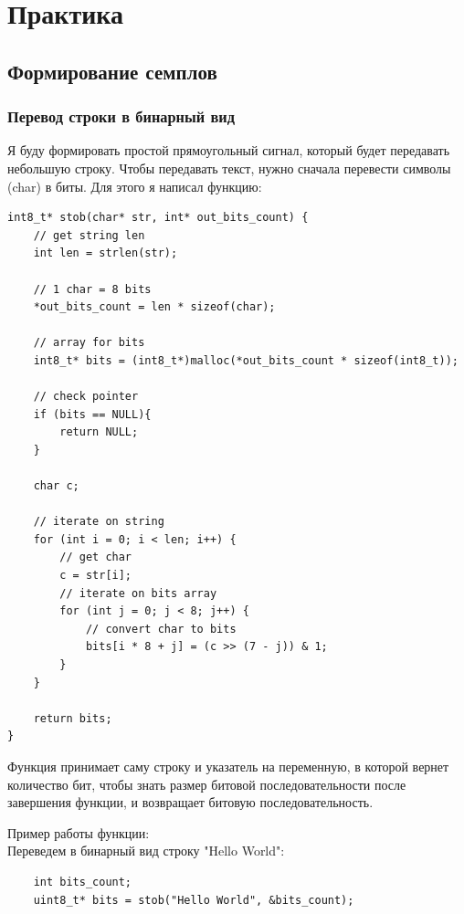 \chapter{Практика}

\section{Формирование семплов}

\subsection{Перевод строки в бинарный вид}

Я буду формировать простой прямоугольный сигнал, который будет передавать небольшую строку. Чтобы передавать текст, нужно сначала перевести символы (char) в биты.
Для этого я написал функцию:

\begin{lstlisting}
int8_t* stob(char* str, int* out_bits_count) {
    // get string len
    int len = strlen(str);

    // 1 char = 8 bits 
    *out_bits_count = len * sizeof(char);
    
    // array for bits
    int8_t* bits = (int8_t*)malloc(*out_bits_count * sizeof(int8_t));

    // check pointer
    if (bits == NULL){
        return NULL;
    }
        
    char c;

    // iterate on string
    for (int i = 0; i < len; i++) {
        // get char 
        c = str[i];
        // iterate on bits array
        for (int j = 0; j < 8; j++) {
            // convert char to bits 
            bits[i * 8 + j] = (c >> (7 - j)) & 1;
        }
    }
    
    return bits;
}
\end{lstlisting}

Функция принимает саму строку и указатель на переменную, в которой вернет количество бит, чтобы знать размер битовой 
последовательности после завершения функции, и возвращает битовую последовательность.

Пример работы функции: \\

Переведем в бинарный вид строку "Hello World":

\begin{lstlisting}
    int bits_count;
    uint8_t* bits = stob("Hello World", &bits_count);
\end{lstlisting}

